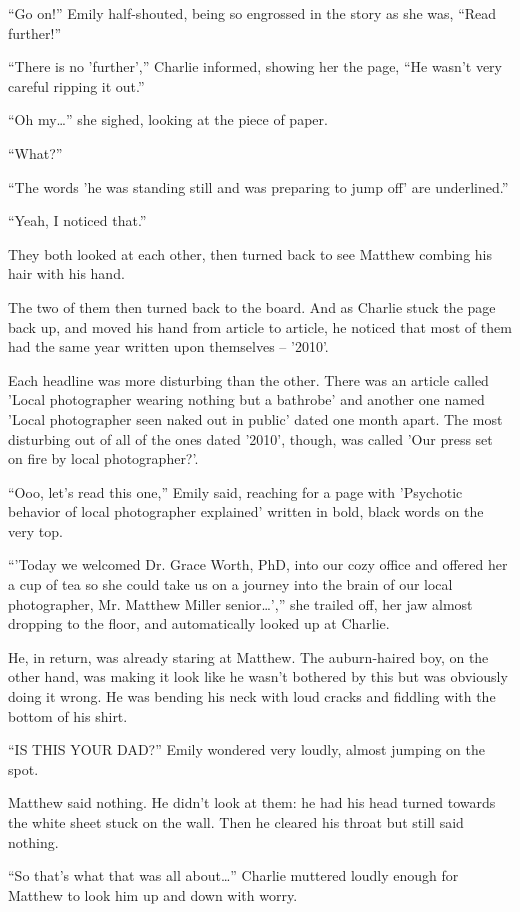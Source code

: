 “Go on!” Emily half-shouted, being so engrossed in the story as she was, “Read further!”

“There is no 'further',” Charlie informed, showing her the page, “He wasn't very careful ripping it out.”

“Oh my…” she sighed, looking at the piece of paper.

“What?”

“The words 'he was standing still and was preparing to jump off' are underlined.”

“Yeah, I noticed that.”

They both looked at each other, then turned back to see Matthew combing his hair with his hand. 

The two of them then turned back to the board. And as Charlie stuck the page back up, and moved his hand from article to article, he noticed that most of them had the same year written upon themselves – '2010'.

Each headline was more disturbing than the other. There was an article called 'Local photographer wearing nothing but a bathrobe' and another one named 'Local photographer seen naked out in public' dated one month apart. The most disturbing out of all of the ones dated '2010', though, was called 'Our press set on fire by local photographer?'.

“Ooo, let's read this one,” Emily said, reaching for a page with 'Psychotic behavior of local photographer explained' written in bold, black words on the very top.

“'Today we welcomed Dr. Grace Worth, PhD, into our cozy office and offered her a cup of tea so she could take us on a journey into the brain of our local photographer, Mr. Matthew Miller senior…',” she trailed off, her jaw almost dropping to the floor, and automatically looked up at Charlie.

He, in return, was already staring at Matthew. The auburn-haired boy, on the other hand, was making it look like he wasn't bothered by this but was obviously doing it wrong. He was bending his neck with loud cracks and fiddling with the bottom of his shirt.

“IS THIS YOUR DAD?” Emily wondered very loudly, almost jumping on the spot.

Matthew said nothing. He didn't look at them: he had his head turned towards the white sheet stuck on the wall. Then he cleared his throat but still said nothing.

“So that's what that was all about…” Charlie muttered loudly enough for Matthew to look him up and down with worry.

